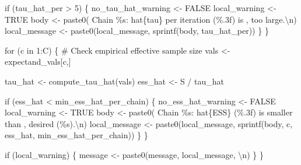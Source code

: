 \documentclass[
  letterpaper,
  DIV=11,
  numbers=noendperiod]{scrartcl}
\newenvironment{Shaded}{\begin{snugshade}}{\end{snugshade}}
\newcommand{\CharTok}[1]{\textcolor[rgb]{0.13,0.47,0.30}{#1}}
\newcommand{\CommentTok}[1]{\textcolor[rgb]{0.37,0.37,0.37}{#1}}
\newcommand{\ControlFlowTok}[1]{\textcolor[rgb]{0.00,0.23,0.31}{#1}}
\newcommand{\DecValTok}[1]{\textcolor[rgb]{0.68,0.00,0.00}{#1}}
\newcommand{\KeywordTok}[1]{\textcolor[rgb]{0.00,0.23,0.31}{#1}}
\newcommand{\NormalTok}[1]{\textcolor[rgb]{0.00,0.23,0.31}{#1}}
\newcommand{\OperatorTok}[1]{\textcolor[rgb]{0.37,0.37,0.37}{#1}}
\newcommand{\SpecialCharTok}[1]{\textcolor[rgb]{0.37,0.37,0.37}{#1}}
\newcommand{\StringTok}[1]{\textcolor[rgb]{0.13,0.47,0.30}{#1}}
\begin{document}
\begin{Shaded}
\begin{Highlighting}[]
      \ControlFlowTok{if}\NormalTok{ (tau\_hat\_per }\OperatorTok{\textgreater{}} \DecValTok{5}\NormalTok{) \{}
\NormalTok{        no\_tau\_hat\_warning }\OperatorTok{\textless{}{-}}\NormalTok{ FALSE}
\NormalTok{        local\_warning }\OperatorTok{\textless{}{-}}\NormalTok{ TRUE}
\NormalTok{        body }\OperatorTok{\textless{}{-}}\NormalTok{ paste0(}\StringTok{\textquotesingle{}  Chain }\SpecialCharTok{\%s}\StringTok{: hat}\SpecialCharTok{\{tau\}}\StringTok{ per iteration (}\SpecialCharTok{\%.3f}\StringTok{) is \textquotesingle{}}\NormalTok{,}
                       \StringTok{\textquotesingle{}too large.}\CharTok{\textbackslash{}n}\StringTok{\textquotesingle{}}\NormalTok{)}
\NormalTok{        local\_message }\OperatorTok{\textless{}{-}}\NormalTok{ paste0(local\_message,}
\NormalTok{                                sprintf(body, tau\_hat\_per))}
\NormalTok{      \}}
\NormalTok{    \}}

    \ControlFlowTok{for}\NormalTok{ (c }\KeywordTok{in} \DecValTok{1}\NormalTok{:C) \{}
      \CommentTok{\# Check empirical effective sample size}
\NormalTok{      vals }\OperatorTok{\textless{}{-}}\NormalTok{ expectand\_vals[c,]}
      
\NormalTok{      tau\_hat }\OperatorTok{\textless{}{-}}\NormalTok{ compute\_tau\_hat(vals)}
\NormalTok{      ess\_hat }\OperatorTok{\textless{}{-}}\NormalTok{ S }\OperatorTok{/}\NormalTok{ tau\_hat}
      
      \ControlFlowTok{if}\NormalTok{ (ess\_hat }\OperatorTok{\textless{}}\NormalTok{ min\_ess\_hat\_per\_chain) \{}
\NormalTok{        no\_ess\_hat\_warning }\OperatorTok{\textless{}{-}}\NormalTok{ FALSE}
\NormalTok{        local\_warning }\OperatorTok{\textless{}{-}}\NormalTok{ TRUE}
\NormalTok{        body }\OperatorTok{\textless{}{-}}\NormalTok{ paste0(}\StringTok{\textquotesingle{}  Chain }\SpecialCharTok{\%s}\StringTok{: hat}\SpecialCharTok{\{ESS\}}\StringTok{ (}\SpecialCharTok{\%.3f}\StringTok{) is smaller than \textquotesingle{}}\NormalTok{,}
                       \StringTok{\textquotesingle{}desired (}\SpecialCharTok{\%s}\StringTok{).}\CharTok{\textbackslash{}n}\StringTok{\textquotesingle{}}\NormalTok{)}
\NormalTok{        local\_message }\OperatorTok{\textless{}{-}}\NormalTok{ paste0(local\_message,}
\NormalTok{                                sprintf(body, c, ess\_hat,}
\NormalTok{                                        min\_ess\_hat\_per\_chain))}
\NormalTok{      \}}
\NormalTok{    \}}
    
    \ControlFlowTok{if}\NormalTok{ (local\_warning) \{}
\NormalTok{      message }\OperatorTok{\textless{}{-}}\NormalTok{ paste0(message, local\_message, }\StringTok{\textquotesingle{}}\CharTok{\textbackslash{}n}\StringTok{\textquotesingle{}}\NormalTok{)}
\NormalTok{    \}}
\NormalTok{  \}}


\end{Highlighting}
\end{Shaded}
\end{document}
